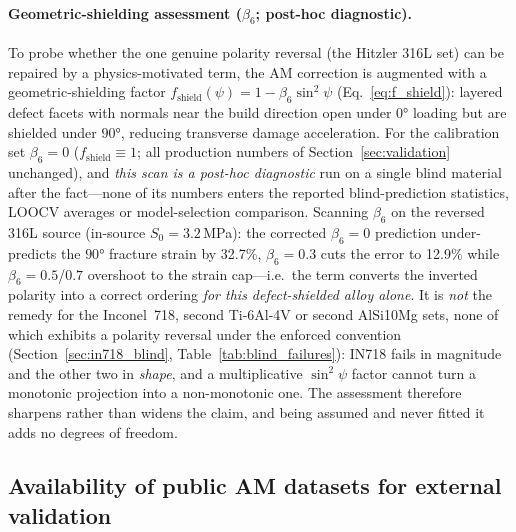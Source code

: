 \paragraph{Geometric-shielding assessment ($\beta_6$; post-hoc diagnostic).} To probe whether the one genuine polarity reversal (the Hitzler 316L set) can be repaired by a physics-motivated term, the AM correction is augmented with a geometric-shielding factor $f_{\text{shield}}(\psi) = 1 - \beta_6 \sin^2\psi$ (Eq.~\eqref{eq:f_shield}): layered defect facets with normals near the build direction open under $\ang{0}$ loading but are shielded under $\ang{90}$, reducing transverse damage acceleration. For the calibration set $\beta_6 = 0$ ($f_{\text{shield}} \equiv 1$; all production numbers of Section~\ref{sec:validation} unchanged), and \emph{this scan is a post-hoc diagnostic} run on a single blind material after the fact---none of its numbers enters the reported blind-prediction statistics, LOOCV averages or model-selection comparison. Scanning $\beta_6$ on the reversed 316L source (in-source $S_0 = 3.2$\,MPa): the corrected $\beta_6 = 0$ prediction under-predicts the $\ang{90}$ fracture strain by 32.7\%, $\beta_6 = 0.3$ cuts the error to 12.9\% while $\beta_6 = 0.5$/$0.7$ overshoot to the strain cap---i.e.\ the term converts the inverted polarity into a correct ordering \emph{for this defect-shielded alloy alone}. It is \emph{not} the remedy for the Inconel~718, second Ti-6Al-4V or second AlSi10Mg sets, none of which exhibits a polarity reversal under the enforced convention (Section~\ref{sec:in718_blind}, Table~\ref{tab:blind_failures}): IN718 fails in magnitude and the other two in \emph{shape}, and a multiplicative $\sin^2\psi$ factor cannot turn a monotonic projection into a non-monotonic one. The assessment therefore sharpens rather than widens the claim, and being assumed and never fitted it adds no degrees of freedom.


\subsection{Availability of public AM datasets for external validation}
\label{sec:public_datasets}

